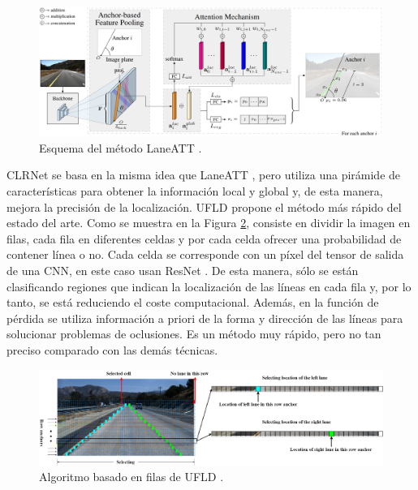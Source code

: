 \documentclass[a4paper, oneside, onecolumn, 11pt]{article}
\begin{document}
\begin{figure} [h]
    \begin{center}
        \includegraphics[width=\textwidth]{figs/laneAtt.png}
    \end{center}
    \caption{Esquema del método LaneATT \cite{tabelini2021keep}.}
    \label{fig:late_att}
\end{figure}

CLRNet \cite{zheng2022clrnet} se basa en la misma idea que LaneATT \cite{tabelini2021keep}, pero utiliza una pirámide de características para obtener la información local y global y, de esta manera, mejora la precisión de la localización. UFLD \cite{Qin2020} propone el método más rápido del estado del arte. Como se muestra en la Figura \ref{fig:lane_rows}, consiste en dividir la imagen en filas, cada fila en diferentes celdas y por cada celda ofrecer una probabilidad de contener línea o no. Cada celda se corresponde con un píxel del tensor de salida de una CNN, en este caso usan ResNet \cite{he2016deep}. De esta manera, sólo se están clasificando regiones que indican la localización de las líneas en cada fila y, por lo tanto, se está reduciendo el coste computacional. Además, en la función de pérdida se utiliza información a priori de la forma y dirección de las líneas para solucionar problemas de oclusiones. Es un método muy rápido, pero no tan preciso comparado con las demás técnicas.

\begin{figure} [h!]
    \begin{center}
      \includegraphics[width=\textwidth]{figs/lane-rows.png}
    \end{center}
    \caption{Algoritmo basado en filas de UFLD \cite{Qin2020}.}
    \label{fig:lane_rows}
\end{figure}
\end{document}
